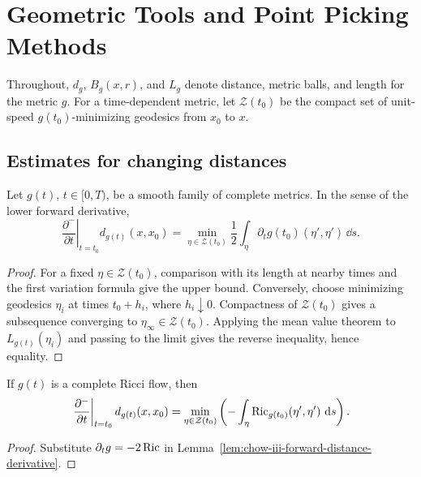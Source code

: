 \chapter{Geometric Tools and Point Picking Methods}
\label{ch:chow-iii-geometric-tools-point-picking}

Throughout, \(d_g\), \(B_g(x,r)\), and \(L_g\) denote distance, metric balls,
and length for the metric \(g\).  For a time-dependent metric, let
\(\mathcal Z(t_0)\) be the compact set of unit-speed \(g(t_0)\)-minimizing
geodesics from \(x_0\) to \(x\).

\section{Estimates for changing distances}

\begin{lemma}
\label{lem:chow-iii-forward-distance-derivative}
Let \(g(t)\), \(t\in[0,T)\), be a smooth family of complete metrics.  In the
sense of the lower forward derivative,
\[
 \left.\frac{\partial^-}{\partial t}\right|_{t=t_0}d_{g(t)}(x,x_0)
 =\min_{\eta\in\mathcal Z(t_0)}\frac12\int_\eta
 \partial_tg(t_0)(\eta',\eta')\,\dd s .
\]
\end{lemma}
\begin{proof}
For a fixed \(\eta\in\mathcal Z(t_0)\), comparison with its length at nearby
times and the first variation formula give the upper bound.  Conversely,
choose minimizing geodesics \(\eta_i\) at times \(t_0+h_i\), where
\(h_i\downarrow0\).  Compactness of \(\mathcal Z(t_0)\) gives a subsequence
converging to \(\eta_\infty\in\mathcal Z(t_0)\).  Applying the mean value
theorem to \(L_{g(t)}(\eta_i)\) and passing to the limit gives the reverse
inequality, hence equality.
\end{proof}

\begin{corollary}
\label{cor:chow-iii-forward-distance-derivative-ricci-flow}
If \(g(t)\) is a complete Ricci flow, then
\[
 \left.\frac{\partial^-}{\partial t}\right|_{t=t_0}d_{g(t)}(x,x_0)
 =\min_{\eta\in\mathcal Z(t_0)}
 \left(-\int_\eta\Ric_{g(t_0)}(\eta',\eta')\,\dd s\right).
\]
\end{corollary}
\begin{proof}
Substitute \(\partial_tg=-2\operatorname{Ric}\) in
Lemma~\ref{lem:chow-iii-forward-distance-derivative}.
\end{proof}

